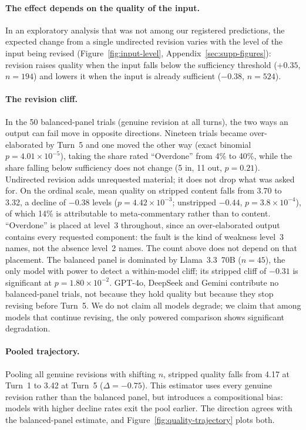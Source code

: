 \paragraph{The effect depends on the quality of the input.} In an exploratory analysis that was not among our registered
predictions, the expected change from a single undirected revision varies with the level of
the input being revised
(Figure~\ref{fig:input-level}, Appendix~\ref{sec:supp-figures}): revision raises quality when the input falls below the
sufficiency threshold ($+0.35$, $n = 194$) and lowers it when the input is already
sufficient ($-0.38$, $n = 524$).

\paragraph{The revision cliff.}
In the 50 balanced-panel trials (genuine revision at all turns), the two ways an output can
fail move in opposite directions. Nineteen trials became over-elaborated by Turn~5 and one
moved the other way (exact binomial $p = 4.01 \times 10^{-5}$), taking the share rated
``Overdone'' from 4\% to 40\%, while the share falling below sufficiency does not change (5
in, 11 out, $p = 0.21$). Undirected revision adds unrequested material; it does not drop what
was asked for. On the ordinal scale, mean quality on stripped content falls from 3.70 to 3.32,
a decline of $-0.38$ levels ($p = 4.42 \times 10^{-3}$; unstripped $-0.44$, $p = 3.8 \times
10^{-4}$), of which 14\% is attributable to meta-commentary rather than to content.
``Overdone'' is placed at level~3 throughout, since an over-elaborated output contains every
requested component: the fault is the kind of weakness level~3 names, not the absence level~2
names. The count above does not depend on that placement.
The balanced panel is dominated by Llama~3.3~70B ($n = 45$), the only model with power
to detect a within-model cliff; its stripped cliff of $-0.31$ is significant at $p = 1.80 \times 10^{-2}$. GPT-4o, DeepSeek and Gemini contribute no balanced-panel trials,
not because they hold quality but because they stop revising before Turn~5. We do not claim
all models degrade; we claim that among models that continue revising, the only powered
comparison shows significant degradation.

\paragraph{Pooled trajectory.} Pooling all genuine revisions with shifting $n$, stripped
quality falls from 4.17 at Turn~1 to 3.42 at Turn~5 ($\Delta = -0.75$). This estimator uses
every genuine revision rather than the balanced panel, but introduces a compositional bias:
models with higher decline rates exit the pool earlier. The direction agrees with the
balanced-panel estimate, and Figure~\ref{fig:quality-trajectory} plots both.

